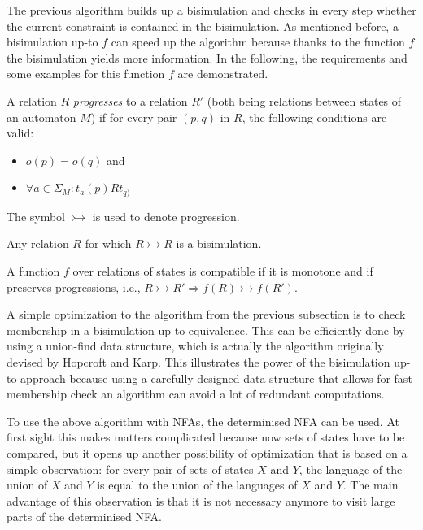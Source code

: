 The previous algorithm builds up a bisimulation and checks in every step whether
the current constraint is contained in the bisimulation.
As mentioned before, a bisimulation up-to $f$ can speed up the algorithm
because thanks to the function $f$ the bisimulation yields more information.
In the following, the requirements and some examples for this function $f$ are demonstrated.

\begin{definition}
    A relation $R$ \textit{progresses} to a relation $R'$
    (both being relations between states of an automaton $M$)
    if for every pair $(p, q)$ in $R$, the following conditions are valid:

    \begin{itemize}
        \item $o(p) = o(q)$ and
        \item $\forall a \in \Sigma_M: t_a(p) R t_{q)}$
    \end{itemize}

    The symbol $\rightarrowtail$ is used to denote progression.
\end{definition}

\begin{example}
    Any relation $R$ for which $R \rightarrowtail R$ is a bisimulation.
\end{example}

\begin{definition}
    A function $f$ over relations of states is compatible if it is monotone and if
    preserves progressions, i.e., $R \rightarrowtail R' \Rightarrow f(R) \rightarrowtail f(R')$.
\end{definition}

A simple optimization to the algorithm from the previous subsection is
to check membership in a bisimulation up-to equivalence.
This can be efficiently done by using a union-find data structure, which
is actually the algorithm originally devised by Hopcroft and Karp.
This illustrates the power of the bisimulation up-to approach because
using a carefully designed data structure that allows for fast membership check
an algorithm can avoid a lot of redundant computations.


To use the above algorithm with NFAs, the determinised NFA can be used.
At first sight this makes matters complicated because now sets of states
have to be compared, but it opens up another possibility of optimization
that is based on a simple observation:
for every pair of sets of states $X$ and $Y$,
the language of the union of $X$ and $Y$ is equal to
the union of the languages of $X$ and $Y$.
The main advantage of this observation is that it is not necessary anymore
to visit large parts of the determinised NFA.

